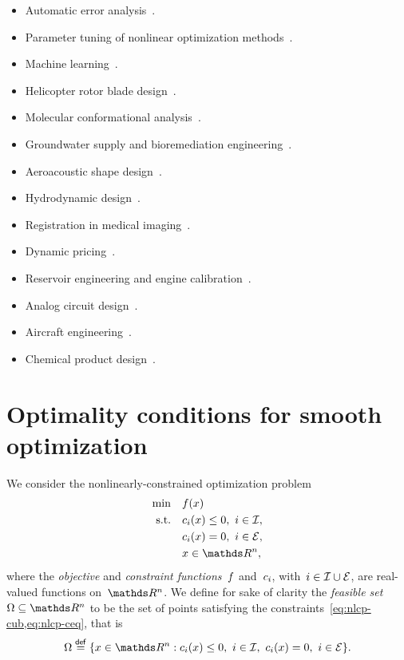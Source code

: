 \begin{itemize}
    \item Automatic error analysis~\cite{Higham_1993,Higham_2002}.
    \item Parameter tuning of nonlinear optimization methods~\cite{Audet_Orban_2006}.
    \item Machine learning~\cite{Ghanbari_Scheinberg_2017,Qian_Yu_2021}.
    \item Helicopter rotor blade design~\cite{Booker_Etal_1998a,Booker_Etal_1998b,Serafini_1998}.
    \item Molecular conformational analysis~\cite{Alberto_Etal_2004,Meza_Martinez_1994}.
    \item Groundwater supply and bioremediation engineering~\cite{Fowler_Etal_2008,Mugunthan_Shoemaker_Regis_2005,Yoon_Shoemaker_1999}.
    \item Aeroacoustic shape design~\cite{Marsden_2004,Marsden_Etal_2004}.
    \item Hydrodynamic design~\cite{Duvigneau_Visonneau_2004}.
    \item Registration in medical imaging~\cite{Oeuvray_2005,Oeuvray_Bierlaire_2007}.
    \item Dynamic pricing~\cite{Levina_Etal_2009}.
    \item Reservoir engineering and engine calibration~\cite{Langouet_2011}.
    \item Analog circuit design~\cite{Latorre_Etal_2019}.
    \item Aircraft engineering~\cite{Gazaix_Etal_2019}.
    \item Chemical product design~\cite{Sun_Etal_2020}.
\end{itemize}

\section{Optimality conditions for smooth optimization}

We consider the nonlinearly-constrained optimization problem
\begin{subequations}
    \label{eq:nlcp}
    \begin{align}
        \min        & \quad \obj(x) \label{eq:nlcp-obj}\\
        \text{s.t.} & \quad \con{i}(x) \le 0, ~ i \in \iub, \label{eq:nlcp-cub}\\
                    & \quad \con{i}(x) = 0, ~ i \in \ieq, \label{eq:nlcp-ceq}\\
                    & \quad x \in \R^n, \nonumber
    \end{align}
\end{subequations}
where the \emph{objective} and \emph{constraint functions}~$f$ and~$c_{i}$, with~$i \in \mathcal{I} \cup \mathcal{E}$, are real-valued functions on~$\R^n$.
We define for sake of clarity the \emph{feasible set}~$\Omega \subseteq \R^n$ to be the set of points satisfying the constraints~\cref{eq:nlcp-cub,eq:nlcp-ceq}, that is
\begin{equation*}
    \Omega \eqdef \set{x \in \R^n : \con{i}(x) \le 0, ~ i \in \iub, ~ \con{i}(x) = 0, ~ i \in \ieq}.
\end{equation*}

